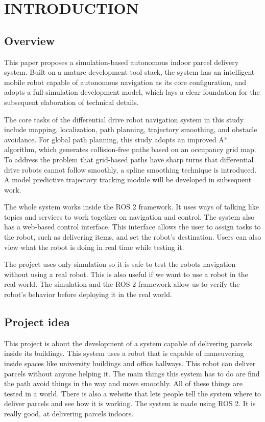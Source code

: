 \chapter{INTRODUCTION}
\label{ch:introduction}

\section{Overview}
This paper proposes a simulation-based autonomous indoor parcel delivery system. Built on a mature development tool stack, the system has an intelligent mobile robot capable of autonomous navigation as its core configuration, and adopts a full-simulation development model, which lays a clear foundation for the subsequent elaboration of technical details.

The core tasks of the differential drive robot navigation system in this study include mapping, localization, path planning, trajectory smoothing, and obstacle avoidance. For global path planning, this study adopts an improved A* algorithm, which generates collision-free paths based on an occupancy grid map. To address the problem that grid-based paths have sharp turns that differential drive robots cannot follow smoothly, a spline smoothing technique is introduced. A model predictive trajectory tracking module will be developed in subsequent work.

The whole system works inside the ROS 2 framework. It uses ways of talking like topics and services to work together on navigation and control. The system also has a web-based control interface. This interface allows the user to assign tasks to the robot, such as delivering items, and set the robot's destination. Users can also view what the robot is doing in real time while testing it.

The project uses only simulation so it is safe to test the robots navigation without using a real robot. This is also useful if we want to use a robot in the real world. The simulation and the ROS 2 framework allow us to verify the robot’s behavior before deploying it in the real world.

\section{Project idea} 
This project is about the development of a system capable of delivering parcels inside its buildings. This system uses a robot that is capable of maneuvering inside spaces like university buildings and office hallways. This robot can deliver parcels without anyone helping it. The main things this system has to do are find the path avoid things in the way and move smoothly. All of these things are tested in a world. There is also a website that lets people tell the system where to deliver parcels and see how it is working. The system is made using ROS 2. It is really good, at delivering parcels indoors.

